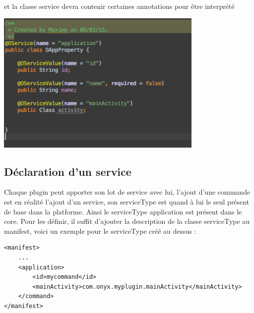 et la classe service devra contenir certaines annotations pour être interprété

\includegraphics[width=10cm]{figures/newServiceType.png}

\subsection{Déclaration d'un service}

Chaque plugin peut apporter son lot de service avec lui, l'ajout d'une commande est en réalité l'ajout d'un service, son serviceType est quand à lui le seul présent de base dans la platforme. Ainsi le serviceType application est présent dans le core. Pour les définir, il suffit d'ajouter la description de la classe serviceType au manifest, voici un exemple pour le serviceType créé au dessus : 

\begin{verbatim}
<manifest>
    ...
    <application>
        <id>mycommand</id>
        <mainActivity>com.onyx.myplugin.mainActivity</mainActivity>
    </command>
</manifest>
\end{verbatim}
